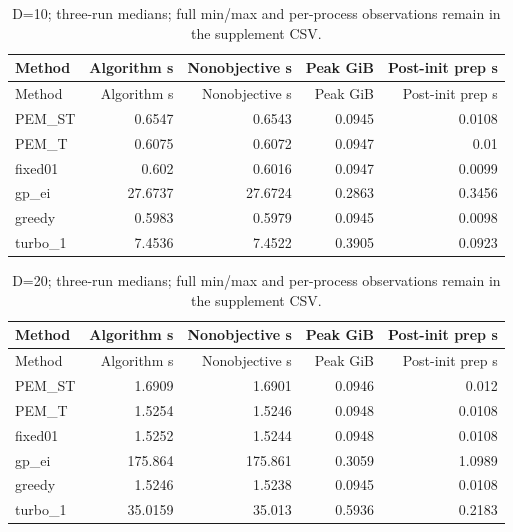\documentclass[11pt,a4paper]{article}
\begin{document}
\par\noindent\begin{minipage}{\linewidth}

\begin{longtable}[]{@{}lrrrr@{}}
\caption{D=10; three-run medians; full min/max and per-process
observations remain in the supplement CSV.}\tabularnewline
\toprule
Method & Algorithm s & Nonobjective s & Peak GiB & Post-init prep s \\
\midrule
\endfirsthead
\toprule
Method & Algorithm s & Nonobjective s & Peak GiB & Post-init prep s \\
\midrule
\endhead
PEM\_ST & 0.6547 & 0.6543 & 0.0945 & 0.0108 \\
PEM\_T & 0.6075 & 0.6072 & 0.0947 & 0.01 \\
fixed01 & 0.602 & 0.6016 & 0.0947 & 0.0099 \\
gp\_ei & 27.6737 & 27.6724 & 0.2863 & 0.3456 \\
greedy & 0.5983 & 0.5979 & 0.0945 & 0.0098 \\
turbo\_1 & 7.4536 & 7.4522 & 0.3905 & 0.0923 \\
\bottomrule
\end{longtable}

\end{minipage}\par

\par\noindent\begin{minipage}{\linewidth}

\begin{longtable}[]{@{}lrrrr@{}}
\caption{D=20; three-run medians; full min/max and per-process
observations remain in the supplement CSV.}\tabularnewline
\toprule
Method & Algorithm s & Nonobjective s & Peak GiB & Post-init prep s \\
\midrule
\endfirsthead
\toprule
Method & Algorithm s & Nonobjective s & Peak GiB & Post-init prep s \\
\midrule
\endhead
PEM\_ST & 1.6909 & 1.6901 & 0.0946 & 0.012 \\
PEM\_T & 1.5254 & 1.5246 & 0.0948 & 0.0108 \\
fixed01 & 1.5252 & 1.5244 & 0.0948 & 0.0108 \\
gp\_ei & 175.864 & 175.861 & 0.3059 & 1.0989 \\
greedy & 1.5246 & 1.5238 & 0.0945 & 0.0108 \\
turbo\_1 & 35.0159 & 35.013 & 0.5936 & 0.2183 \\
\bottomrule
\end{longtable}

\end{minipage}\par
\end{document}
